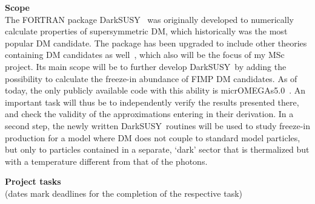 \documentclass[12pt,a4paper]{article}
\newcommand{\ds}{{\sf DarkSUSY}}
\begin{document}
 \vspace*{0.6cm}
\noindent
{\bf Scope}\\[1ex]
The FORTRAN package \ds~\cite{DarkSUSYsite} was originally developed to numerically calculate properties of 
supersymmetric DM, which historically was the most popular DM candidate. The package has been upgraded to include 
other theories containing DM candidates as well~\cite{DarkSUSY}, which also will be the focus of my MSc project. 
Its main scope will be to further develop \ds\ by adding the possibility to calculate the freeze-in abundance of FIMP 
DM candidates.
As of today, the only publicly available code with this ability is {\sf micrOMEGAs5.0}~\cite{micrOMEGAs5}. An important 
task will thus be to independently verify the results presented there, and check the validity of the approximations
entering in their derivation. In a second step, the newly written \ds~routines will be used to study freeze-in production
for a model where DM does not couple to standard model particles, but only to particles contained in a separate, `dark'
sector that is thermalized but with a temperature different from that of the photons.


 \vspace*{0.6cm}
\noindent
{\bf Project tasks}\\
{\scriptsize (dates mark deadlines for the completion of the respective task)}\\[-3ex]
\end{document}
